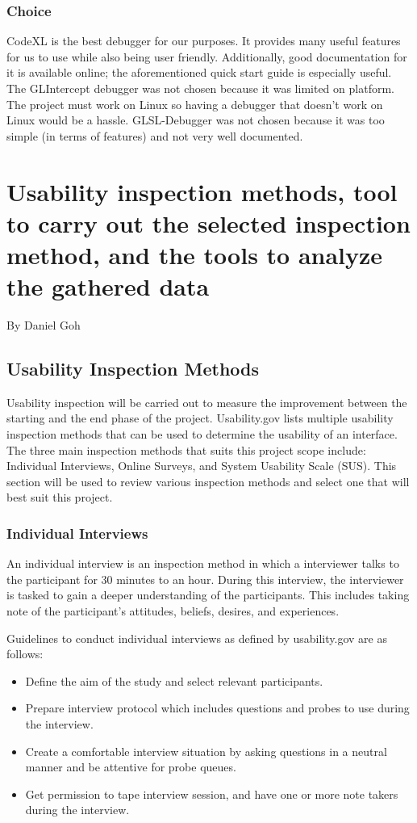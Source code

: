 \documentclass[10pt,journal,compsoc,draftclsnofoot]{IEEEtran}
\begin{document}
\subsubsection{Choice}
CodeXL is the best debugger for our purposes.
It provides many useful features for us to use while also being user friendly. 
Additionally, good documentation for it is available online; the aforementioned quick start guide is especially useful.
The GLIntercept debugger was not chosen because it was limited on platform.
The project must work on Linux so having a debugger that doesn't work on Linux would be a hassle.
GLSL-Debugger was not chosen because it was too simple (in terms of features) and not very well documented.

\newpage

\section{Usability inspection methods, tool to carry out the selected inspection method, and the tools to analyze the gathered data}
\large{By Daniel Goh}

\normalsize
\subsection{Usability Inspection Methods}
Usability inspection will be carried out to measure the improvement between the starting and the end phase of the project.
Usability.gov lists multiple usability inspection methods that can be used to determine the usability of an interface. \cite{userResearch}
The three main inspection methods that suits this project scope include: Individual Interviews, Online Surveys, and System Usability Scale (SUS).
This section will be used to review various inspection methods and select one that will best suit this project.

\subsubsection{Individual Interviews}
An individual interview is an inspection method in which a interviewer talks to the participant for 30 minutes to an hour.
During this interview, the interviewer is tasked to gain a deeper understanding of the participants.
This includes taking note of the participant's attitudes, beliefs, desires, and experiences.

Guidelines to conduct individual interviews as defined by usability.gov are as follows:
\begin{itemize}
\item Define the aim of the study and select relevant participants.
\item Prepare interview protocol which includes questions and probes to use during the interview.
\item Create a comfortable interview situation by asking questions in a neutral manner and be attentive for probe queues.
\item Get permission to tape interview session, and have one or more note takers during the interview.
\end{itemize}
\end{document}
